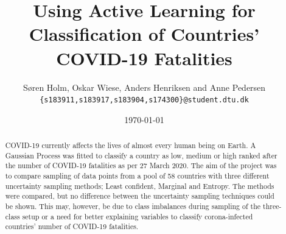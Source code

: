 \documentclass[fleqn]{article}
\title{\vspace*{-3.75cm} Using Active Learning for Classification of Countries' COVID-19 Fatalities}
\author{Søren Holm, Oskar Wiese, Anders Henriksen and Anne Pedersen \\
\small {\texttt{\{s183911,s183917,s183904,s174300\}@student.dtu.dk}}}
\date{\today}
\begin{document}
\fontsize{12}{14}\rm

\maketitle

\begin{abstract} %
	\noindent COVID-19 currently affects the lives of almost every human being on Earth. A Gaussian Process was fitted to classify a country as low, medium or high ranked after the number of COVID-19 fatalities as per 27 March 2020. The aim of the project was to compare sampling of data points from a pool of 58 countries with three different uncertainty sampling methods; Least confident, Marginal and Entropy. The methods were compared, but no difference between the uncertainty sampling techniques could be shown. This may, however, be due to class imbalances during sampling of the three-class setup or a need for better explaining variables to classify corona-infected countries' number of COVID-19 fatalities.
\end{abstract}
\end{document}
